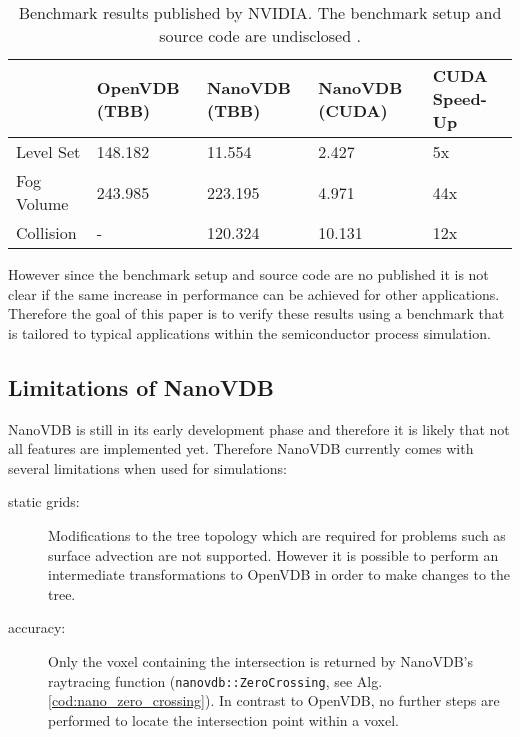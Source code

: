 \begin{table}[H]
	\caption{Benchmark results published by NVIDIA. The benchmark setup and source code are undisclosed \cite{nanovdb_nvidia}.}
	\centering
	\begin{tabular}{@{}lllll@{}}
		\toprule
		           & OpenVDB (TBB) & NanoVDB (TBB) & NanoVDB (CUDA) & CUDA Speed-Up \\	\hline
		Level Set  & 148.182       & 11.554        & 2.427          & 5x            \\
		Fog Volume & 243.985       & 223.195       & 4.971          & 44x           \\
		Collision  & -             & 120.324       & 10.131         & 12x           \\ \bottomrule
	\end{tabular}
	\label{tab:nvidia_benchmark}
\end{table}


However since the benchmark setup and source code are no published it is not clear if the same increase in performance can be achieved for other applications.
Therefore the goal of this paper is to verify these results using a benchmark that is tailored to typical applications within the semiconductor process simulation.

\newpage
\subsection{Limitations of NanoVDB}
\label{chap:limitations}

NanoVDB is still in its early development phase and therefore it is likely that not all features are implemented yet.
Therefore NanoVDB currently comes with several limitations when used for simulations:

\begin{description}
	\item[static grids:] Modifications to the tree topology which are required for problems such as surface advection are not supported.
	      However it is possible to perform an intermediate transformations to OpenVDB in order to make changes to the tree.
	\item[accuracy:] Only the voxel containing the intersection is returned by NanoVDB's raytracing function (\texttt{nanovdb::ZeroCrossing}, see Alg. \ref{cod:nano_zero_crossing}).
	      In contrast to OpenVDB, no further steps are performed to locate the intersection point within a voxel.
\end{description}




